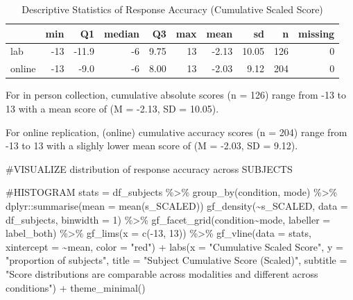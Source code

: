 \documentclass[
  letterpaper,
  DIV=11,
  numbers=noendperiod]{scrreprt}
\newenvironment{Shaded}{\begin{snugshade}}{\end{snugshade}}
\newcommand{\AttributeTok}[1]{\textcolor[rgb]{0.40,0.45,0.13}{#1}}
\newcommand{\CommentTok}[1]{\textcolor[rgb]{0.37,0.37,0.37}{#1}}
\newcommand{\DecValTok}[1]{\textcolor[rgb]{0.68,0.00,0.00}{#1}}
\newcommand{\FunctionTok}[1]{\textcolor[rgb]{0.28,0.35,0.67}{#1}}
\newcommand{\NormalTok}[1]{\textcolor[rgb]{0.00,0.23,0.31}{#1}}
\newcommand{\OtherTok}[1]{\textcolor[rgb]{0.00,0.23,0.31}{#1}}
\newcommand{\SpecialCharTok}[1]{\textcolor[rgb]{0.37,0.37,0.37}{#1}}
\newcommand{\StringTok}[1]{\textcolor[rgb]{0.13,0.47,0.30}{#1}}
\begin{document}
\begin{table}

\caption{Descriptive Statistics of Response Accuracy (Cumulative Scaled Score)}
\centering
\begin{tabular}[t]{l|r|r|r|r|r|r|r|r|r}
\hline
  & min & Q1 & median & Q3 & max & mean & sd & n & missing\\
\hline
lab & -13 & -11.9 & -6 & 9.75 & 13 & -2.13 & 10.05 & 126 & 0\\
\hline
online & -13 & -9.0 & -6 & 8.00 & 13 & -2.03 & 9.12 & 204 & 0\\
\hline
\end{tabular}
\end{table}

For in person collection, cumulative absolute scores (n = 126) range
from -13 to 13 with a mean score of (M = -2.13, SD = 10.05).

For online replication, (online) cumulative accuracy scores (n = 204)
range from -13 to 13 with a slighly lower mean score of (M = -2.03, SD =
9.12).

\begin{Shaded}
\begin{Highlighting}[]
\CommentTok{\#VISUALIZE distribution of response accuracy across SUBJECTS}

\CommentTok{\#HISTOGRAM}
\NormalTok{stats }\OtherTok{=}\NormalTok{ df\_subjects }\SpecialCharTok{\%\textgreater{}\%} \FunctionTok{group\_by}\NormalTok{(condition, mode) }\SpecialCharTok{\%\textgreater{}\%}\NormalTok{ dplyr}\SpecialCharTok{::}\FunctionTok{summarise}\NormalTok{(}\AttributeTok{mean =} \FunctionTok{mean}\NormalTok{(s\_SCALED))}
\FunctionTok{gf\_density}\NormalTok{(}\SpecialCharTok{\textasciitilde{}}\NormalTok{s\_SCALED, }\AttributeTok{data =}\NormalTok{ df\_subjects, }\AttributeTok{binwidth =} \DecValTok{1}\NormalTok{) }\SpecialCharTok{\%\textgreater{}\%} 
  \FunctionTok{gf\_facet\_grid}\NormalTok{(condition}\SpecialCharTok{\textasciitilde{}}\NormalTok{mode, }\AttributeTok{labeller =}\NormalTok{ label\_both) }\SpecialCharTok{\%\textgreater{}\%} 
  \FunctionTok{gf\_lims}\NormalTok{(}\AttributeTok{x =} \FunctionTok{c}\NormalTok{(}\SpecialCharTok{{-}}\DecValTok{13}\NormalTok{, }\DecValTok{13}\NormalTok{)) }\SpecialCharTok{\%\textgreater{}\%}
  \FunctionTok{gf\_vline}\NormalTok{(}\AttributeTok{data =}\NormalTok{ stats, }\AttributeTok{xintercept =} \SpecialCharTok{\textasciitilde{}}\NormalTok{mean, }\AttributeTok{color =} \StringTok{"red"}\NormalTok{) }\SpecialCharTok{+}
   \FunctionTok{labs}\NormalTok{(}\AttributeTok{x =} \StringTok{"Cumulative Scaled Score"}\NormalTok{,}
       \AttributeTok{y =} \StringTok{"proportion of subjects"}\NormalTok{,}
       \AttributeTok{title =} \StringTok{"Subject Cumulative Score (Scaled)"}\NormalTok{,}
       \AttributeTok{subtitle =} \StringTok{"Score distributions are comparable across modalities and different across conditions"}\NormalTok{) }\SpecialCharTok{+} 
  \FunctionTok{theme\_minimal}\NormalTok{()}
\end{Highlighting}
\end{Shaded}
\end{document}
